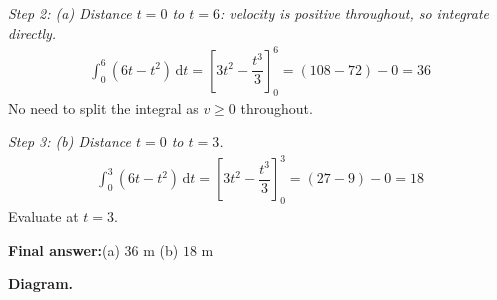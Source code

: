 \documentclass[11pt]{article}
\begin{document}
\textit{Step 2: (a) Distance \( t = 0 \) to \( t = 6 \): velocity is positive throughout, so integrate directly.}
\[\begin{gathered}
\int_0^6 (6t - t^2)\, \mathrm{d}t = \left[3t^2 - \dfrac{t^3}{3}\right]_0^6 = (108 - 72) - 0 = 36
\end{gathered}\]
No need to split the integral as \( v \geq 0 \) throughout.

\textit{Step 3: (b) Distance \( t = 0 \) to \( t = 3 \).}
\[\begin{gathered}
\int_0^3 (6t - t^2)\, \mathrm{d}t = \left[3t^2 - \dfrac{t^3}{3}\right]_0^3 = (27 - 9) - 0 = 18
\end{gathered}\]
Evaluate at \( t = 3 \).

\begin{answerbox}
\textbf{Final answer:}\quad (a) \(\displaystyle 36\) m   (b) \(\displaystyle 18\) m
\end{answerbox}
\textbf{Diagram.}
\end{document}
